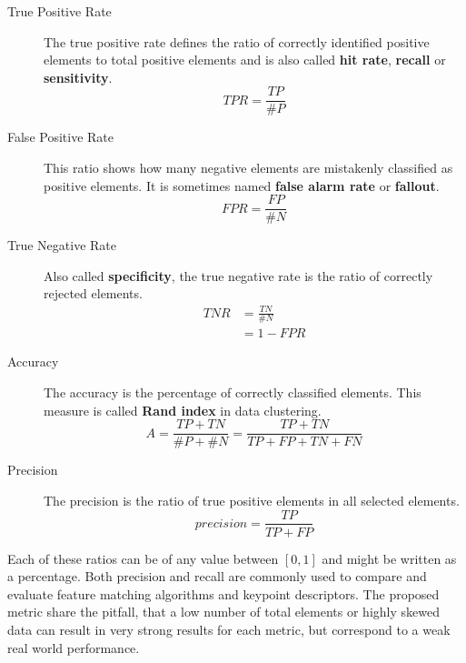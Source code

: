 \begin{description}
    \item[True Positive Rate] The true positive rate defines the ratio of correctly identified positive elements to total positive elements and is also called \textbf{hit rate}, \textbf{recall} or \textbf{sensitivity}.
        \begin{equation}
            TPR = \frac{TP}{\#P}
            \label{eq:true_positive_rate}
        \end{equation}
    \item[False Positive Rate] This ratio shows how many negative elements are mistakenly classified as positive elements. It is sometimes named \textbf{false alarm rate} or \textbf{fallout}.
        \begin{equation}
            FPR = \frac{FP}{\#N}
            \label{eq:false_positive_rate}
        \end{equation}
    \item[True Negative Rate] Also called \textbf{specificity}, the true negative rate is the ratio of correctly rejected elements.
        \begin{equation}
        \begin{aligned}
            TNR &= \frac{TN}{\#N} \\
                &= 1 - FPR
        \end{aligned}
        \label{eq:true_negative_rate}
        \end{equation}
    \item[Accuracy] The accuracy is the percentage of correctly classified elements. This measure is called \textbf{Rand index} in data clustering.
        \begin{equation}
            A = \frac{TP + TN}{\#P + \#N} = \frac{TP + TN}{TP + FP + TN + FN}
            \label{eq:accuracy}
        \end{equation}
    \item[Precision] The precision is the ratio of true positive elements in all selected elements.
        \begin{equation}
            precision = \frac{TP}{TP + FP}
        \end{equation}
\end{description}
Each of these ratios can be of any value between $[0, 1]$ and might be written as a percentage.
Both precision and recall are commonly used to compare and evaluate feature matching algorithms and keypoint descriptors.
The proposed metric share the pitfall, that a low number of total elements or highly skewed data can result in very strong results for each metric, but correspond to a weak real world performance.

